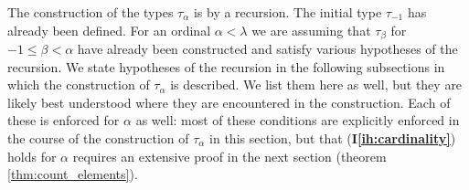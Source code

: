 \documentclass[112pt]{article}
\theoremstyle{definition}
\theoremstyle{remark}
\newcommand{\ihref}[1]{(\textbf{I\ref{#1}})}
\begin{document}
The construction of the types $\tau_\alpha$ is by a recursion.  The initial type $\tau_{-1}$ has already been defined.  For an ordinal $\alpha<\lambda$ we are assuming that $\tau_\beta$ for $-1\leq \beta<\alpha$ have already been constructed and satisfy various hypotheses of the recursion.  We state hypotheses of the recursion in the following subsections in which the construction of $\tau_\alpha$ is described.  We list them here as well, but they are likely best understood where they are encountered in the construction.  Each of these is enforced for $\alpha$ as well:  most of these conditions are explicitly enforced in the course of the construction of $\tau_\alpha$ in this section, but that \ihref{ih:cardinality} holds for $\alpha$ requires an extensive proof in the next section (theorem \ref{thm:count_elements}).
\end{document}
